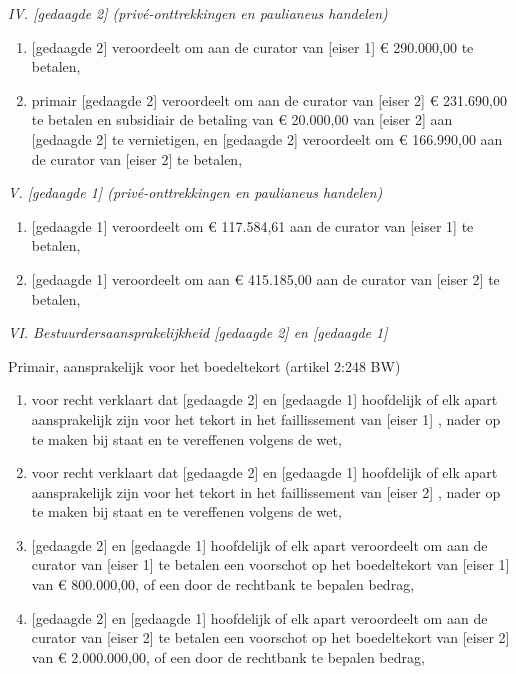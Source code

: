 \documentclass[
  dutch,
  a4paper,
]{article}
\begin{document}
\emph{IV. {[}gedaagde 2{]} (privé-onttrekkingen en paulianeus handelen)}

\begin{enumerate}
\def\labelenumi{\arabic{enumi}.}
\setcounter{enumi}{7}
\item
  {[}gedaagde 2{]} veroordeelt om aan de curator van {[}eiser 1{]} € 290.000,00 te betalen,
\item
  primair {[}gedaagde 2{]} veroordeelt om aan de curator van {[}eiser 2{]} € 231.690,00 te betalen en subsidiair de betaling van € 20.000,00 van {[}eiser 2{]} aan {[}gedaagde 2{]} te vernietigen, en {[}gedaagde 2{]} veroordeelt om € 166.990,00 aan de curator van {[}eiser 2{]} te betalen,
\end{enumerate}

\emph{V. {[}gedaagde 1{]} (privé-onttrekkingen en paulianeus handelen)}

\begin{enumerate}
\def\labelenumi{\arabic{enumi}.}
\setcounter{enumi}{9}
\item
  {[}gedaagde 1{]} veroordeelt om € 117.584,61 aan de curator van {[}eiser 1{]} te betalen,
\item
  {[}gedaagde 1{]} veroordeelt om aan € 415.185,00 aan de curator van {[}eiser 2{]} te betalen,
\end{enumerate}

\emph{VI. Bestuurdersaansprakelijkheid {[}gedaagde 2{]} en {[}gedaagde 1{]}}

Primair, aansprakelijk voor het boedeltekort (artikel 2:248 BW)

\begin{enumerate}
\def\labelenumi{\arabic{enumi}.}
\setcounter{enumi}{11}
\item
  voor recht verklaart dat {[}gedaagde 2{]} en {[}gedaagde 1{]} hoofdelijk of elk apart aansprakelijk zijn voor het tekort in het faillissement van {[}eiser 1{]} , nader op te maken bij staat en te vereffenen volgens de wet,
\item
  voor recht verklaart dat {[}gedaagde 2{]} en {[}gedaagde 1{]} hoofdelijk of elk apart aansprakelijk zijn voor het tekort in het faillissement van {[}eiser 2{]} , nader op te maken bij staat en te vereffenen volgens de wet,
\item
  {[}gedaagde 2{]} en {[}gedaagde 1{]} hoofdelijk of elk apart veroordeelt om aan de curator van {[}eiser 1{]} te betalen een voorschot op het boedeltekort van {[}eiser 1{]} van € 800.000,00, of een door de rechtbank te bepalen bedrag,
\item
  {[}gedaagde 2{]} en {[}gedaagde 1{]} hoofdelijk of elk apart veroordeelt om aan de curator van {[}eiser 2{]} te betalen een voorschot op het boedeltekort van {[}eiser 2{]} van € 2.000.000,00, of een door de rechtbank te bepalen bedrag,
\end{enumerate}
\end{document}
